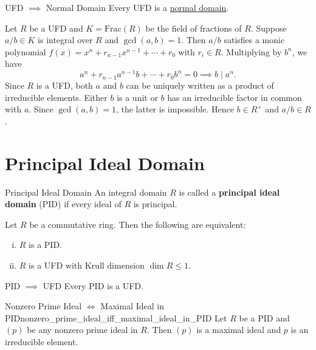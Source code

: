 \begin{proposition}{UFD $\implies$ Normal Domain}{}
    Every UFD is a \hyperref[th:normal_domain]{normal domain}.
\end{proposition}
\begin{prf}
    Let $R$ be a UFD and $K=\mathrm{Frac}(R)$ be the field of fractions of $R$. Suppose $a/b\in K$ is integral over $R$ and $\gcd\left(a,b\right)=1$. Then $a/b$ satisfies a monic polynomial $f(x)=x^n+r_{n-1}x^{n-1}+\cdots+r_0$ with $r_i\in R$. Multiplying by $b^n$, we have 
    \[
        a^n+r_{n-1}a^{n-1}b+\cdots+r_0b^n=0\implies b \mid a^n.
    \]
    Since $R$ is a UFD, both $a$ and $b$ can be uniquely written as a product of irreducible elements. Either $b$ is a unit or $b$ has an irreducible factor in common with $a$. Since $\gcd\left(a,b\right)=1$, the latter is impossible. Hence $b\in R^\times$ and $a/b\in R$.
\end{prf}

\section{Principal Ideal Domain}
\begin{definition}{Principal Ideal Domain}{}
    An integral domain $R$ is called a \textbf{principal ideal domain} (PID) if every ideal of $R$ is principal.
\end{definition}

\begin{proposition}{}{}
    Let $R$ be a commutative ring. Then the following are equivalent:
    \begin{enumerate}[(i)]
        \item $R$ is a PID.
        \item $R$ is a UFD with Krull dimension $\dim R \le 1$.
    \end{enumerate}
\end{proposition}
\begin{corollary}{PID $\implies$ UFD}{}
    Every PID is a UFD.
\end{corollary}


\begin{proposition}{Nonzero Prime Ideal $\iff$ Maximal Ideal in PID}{nonzero_prime_ideal_iff_maximal_ideal_in_PID}
    Let $R$ be a PID and $(p)$ be any nonzero prime ideal in $R$. Then $(p)$ is a maximal ideal and $p$ is an irreducible element.
\end{proposition}

